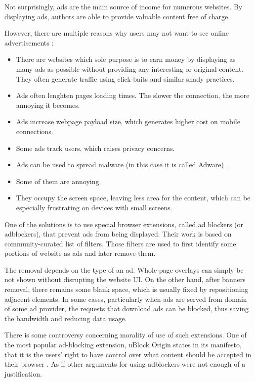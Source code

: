 Not surprisingly, ads are the main source of income for numerous websites. By displaying ads, authors are able to provide
valuable content free of charge. 

However, there are multiple reasons why users may not want to see online advertisements \cite{pagefair:adblock-report}: 
\begin{itemize}
  \item There are websites which sole purpose is to earn money by displaying as many ads 
           as possible without providing any interesting or original content.
           They often generate traffic using click-baits and similar shady practices.
  \item Ads often lenghten pages loading times. The slower the connection, the more annoying it becomes.
  \item Ads increase webpage payload size, which generates higher cost on mobile connections.
  \item Some ads track users, which raises privacy concerns.
  \item Ads can be used to spread malware (in this case it is called Adware) \cite{adblock:adware}.
  \item Some of them are annoying.
  \item They occupy the screen space, leaving less area for the content,
           which can be especially frustrating on devices with small screens.
\end{itemize}

One of the solutions is to use special browser extensions, called ad blockers (or adblockers), 
that prevent ads from being displayed.
Their work is based on community-curated list of filters. Those filters are used to first identify some portions
of website as ads and later remove them.

The removal depends on the type of an ad. Whole page overlays can simply be not shown without disrupting
the website UI. On the other hand, after banners removal, there remains some blank space, which is usually
fixed by repositioning adjacent elements. In some cases, particularly when ads are served from domain
of some ad provider, the requests that download ads can be blocked, thus saving the bandwidth and reducing data usage.

There is some controversy concerning morality of use of such extensions.
One of the most popular ad-blocking extension, uBlock Origin states in its manifesto,
that it is the users' right to have control over what content should be accepted in their browser \cite{ublock:manifesto}.
As if other arguments for using adblockers were not enough of a justification.

